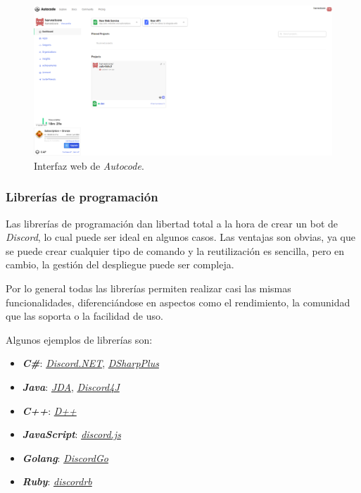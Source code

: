 \begin{figure}[H]
	\centering
	\includegraphics[width=1\textwidth]{img/autocode.png}
	\caption{Interfaz web de \textit{Autocode}.}
\end{figure}

\subsubsection{Librerías de programación}

Las librerías de programación dan libertad total a la hora de crear un bot de \textit{Discord}, lo cual puede ser ideal en algunos casos. Las ventajas son obvias, ya que se puede crear cualquier tipo de comando y la reutilización es sencilla, pero en cambio, la gestión del despliegue puede ser compleja.

Por lo general todas las librerías permiten realizar casi las mismas funcionalidades, diferenciándose en aspectos como el rendimiento, la comunidad que las soporta o la facilidad de uso.

Algunos ejemplos de librerías son:

\begin{itemize}
	\item \textbf{\textit{C\#}}: \href{https://discordnet.dev/}{\textit{Discord.NET}}, \href{https://github.com/DSharpPlus/DSharpPlus}{\textit{DSharpPlus}}
	\item \textbf{\textit{Java}}: \href{https://github.com/DV8FromTheWorld/JDA}{\textit{JDA}}, \href{https://discord4j.com/}{\textit{Discord4J}}
	\item \textbf{\textit{C++}}: \href{https://dpp.dev/}{\textit{D++}}
	\item \textbf{\textit{JavaScript}}: \href{https://discord.js.org/}{\textit{discord.js}}
	\item \textbf{\textit{Golang}}: \href{https://github.com/bwmarrin/discordgo}{\textit{DiscordGo}}
	\item \textbf{\textit{Ruby}}: \href{https://github.com/shardlab/discordrb}{\textit{discordrb}}
\end{itemize}


